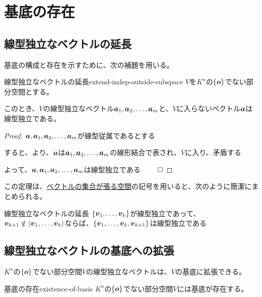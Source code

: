 \documentclass[../../../topic_linear-algebra]{subfiles}
\begin{document}
\sectionline
\section{基底の存在}

\subsection{線型独立なベクトルの延長}

基底の構成と存在を示すために、次の補題を用いる。

\begin{theorem}{線型独立なベクトルの延長}{extend-indep-outside-subspace}
  $V$を$K^n$の$\{\vb*{o} \}$でない部分空間とする。

  このとき、$V$の線型独立なベクトル$\vb*{a}_1, \vb*{a}_2, \dots, \vb*{a}_m$と、$V$に入らないベクトル$\vb*{a}$は線型独立である。
\end{theorem}

\begin{proof}
  $\vb*{a}, \vb*{a}_1, \vb*{a}_2, \dots, \vb*{a}_m$が線型従属であるとする

  すると、より、$\vb*{a}$は$\vb*{a}_1, \vb*{a}_2, \dots, \vb*{a}_m$の線形結合で表され、$V$に入り、矛盾する

  よって、$\vb*{a}, \vb*{a}_1, \vb*{a}_2, \dots, \vb*{a}_m$は線型独立である $\qed$
\end{proof}

\br

この定理は、\hyperref[def:span-of-vectors]{ベクトルの集合が張る空間}の記号を用いると、次のように簡潔にまとめられる。

\begin{theorem*}{線型独立なベクトルの延長}
  $\{ \vb*{v}_1, \dots, \vb*{v}_k \}$が線型独立であって、$\vb*{v}_{k+1} \notin \langle \vb*{v}_1, \dots, \vb*{v}_k \rangle$ならば、$\{ \vb*{v}_1, \dots, \vb*{v}_k, \vb*{v}_{k+1} \}$は線型独立である
\end{theorem*}

\subsection{線型独立なベクトルの基底への拡張}

$K^n$の$\{\vb*{o} \}$でない部分空間$V$の線型独立なベクトルは、$V$の基底に拡張できる。

\begin{theorem}{基底の存在}{existence-of-basis}
  $K^n$の$\{\vb*{o} \}$でない部分空間$V$には基底が存在する。
\end{theorem}
\end{document}
